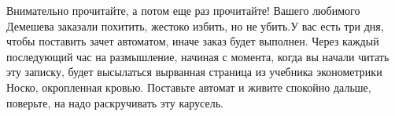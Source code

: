 \documentclass[a4paper,oneside,titlepage,14pt]{extbook}
\begin{document}
 Внимательно прочитайте, а потом еще раз прочитайте! Вашего любимого Демешева заказали похитить, жестоко избить, но не убить.У вас есть три дня, чтобы поставить зачет автоматом, иначе заказ будет выполнен. Через каждый последующий час на размышление, начиная с момента, когда вы начали читать эту записку, будет высылаться вырванная страница из учебника эконометрики Носко, окропленная кровью. Поставьте автомат и живите спокойно дальше, поверьте, на надо раскручивать эту карусель.
\end{document}
